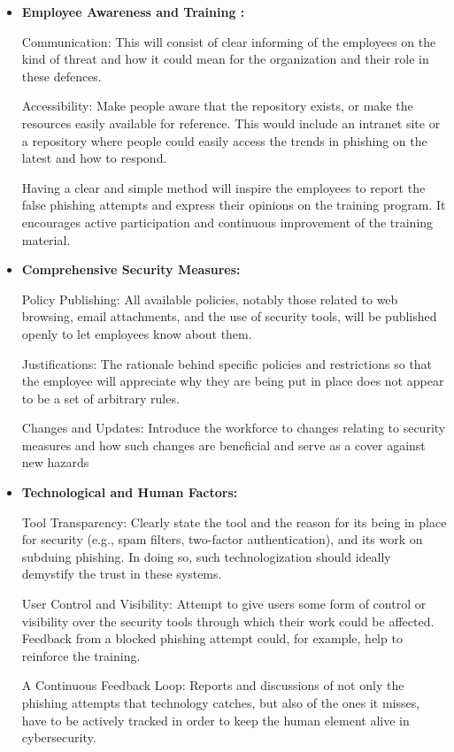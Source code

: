 \begin{itemize}
    \item \textbf{Employee Awareness and Training :} 
    
    Communication: This will consist of clear informing of the employees on the kind of threat and how it could mean for the organization and their role in these defences.
    
Accessibility: Make people aware that the repository exists, or make the resources easily available for reference. This would include an intranet site or a repository where people could easily access the trends in phishing on the latest and how to respond.

Having a clear and simple method will inspire the employees to report the false phishing attempts and express their opinions on the training program. It encourages active participation and continuous improvement of the training material.


     \item \textbf{Comprehensive Security Measures: }
     
     Policy Publishing: All available policies, notably those related to web browsing, email attachments, and the use of security tools, will be published openly to let employees know about them.
     
Justifications: The rationale behind specific policies and restrictions so that the employee will appreciate why they are being put in place does not appear to be a set of arbitrary rules.

Changes and Updates: Introduce the workforce to changes relating to security measures and how such changes are beneficial and serve as a cover against new hazards

     \item \textbf{Technological and Human Factors: } 
     
     Tool Transparency: Clearly state the tool and the reason for its being in place for security (e.g., spam filters, two-factor authentication), and its work on subduing phishing. In doing so, such technologization should ideally demystify the trust in these systems.
     
User Control and Visibility: Attempt to give users some form of control or visibility over the security tools through which their work could be affected. Feedback from a blocked phishing attempt could, for example, help to reinforce the training.

A Continuous Feedback Loop: Reports and discussions of not only the phishing attempts that technology catches, but also of the ones it misses, have to be actively tracked in order to keep the human element alive in cybersecurity.



\end{itemize}
